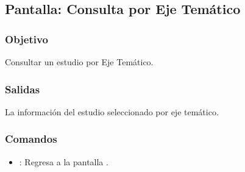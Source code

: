 \subsection{Pantalla: Consulta por Eje Temático}
\subsubsection{Objetivo}
Consultar un estudio por Eje Temático.


\subsubsection{Salidas}
La información del estudio seleccionado por eje temático.


\subsubsection{Comandos}
\begin{itemize}
 \item {}: Regresa a la pantalla .
\end{itemize}







